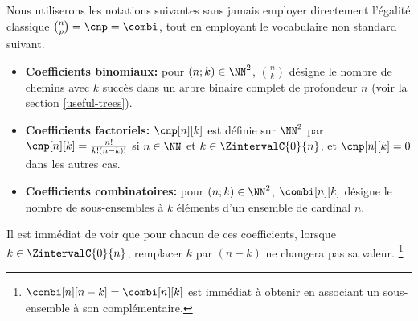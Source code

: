 Nous utiliserons les notations suivantes sans jamais employer directement l'égalité classique $\binom{n}{p} = \cnp = \combi$,
tout en employant le vocabulaire non standard suivant.
%
\begin{itemize}
    \item \textbf{Coefficients binomiaux:}
    pour $(n;k) \in \NN^2$,
    $\binom{n}{k}$ désigne le nombre de chemins avec $k$ succès dans un arbre binaire complet de profondeur $n$ (voir la section  \ref{useful-trees}).


    \item \textbf{Coefficients factoriels:}
    $\cnp[n][k]$ est définie sur $\NN^2$ par
    $\cnp[n][k] = \frac{n!}{k!(n-k)!}$ si $n \in \NN$ et $k \in \ZintervalC{0}{n}$,
    et
    $\cnp[n][k] = 0$ dans les autres cas.


    \item \textbf{Coefficients combinatoires:}
    pour $(n;k) \in \NN^2$,
    $\combi[n][k]$ désigne le nombre de sous-ensembles à $k$ éléments d'un ensemble de cardinal $n$.
\end{itemize}

Il est immédiat de voir que pour chacun de ces coefficients, lorsque $k \in \ZintervalC{0}{n}$, remplacer $k$ par $(n-k)$ ne changera pas sa valeur.%
\footnote{
    $\combi[n][n-k] = \combi[n][k]$ est immédiat à obtenir en associant un sous-ensemble à son complémentaire.
}

